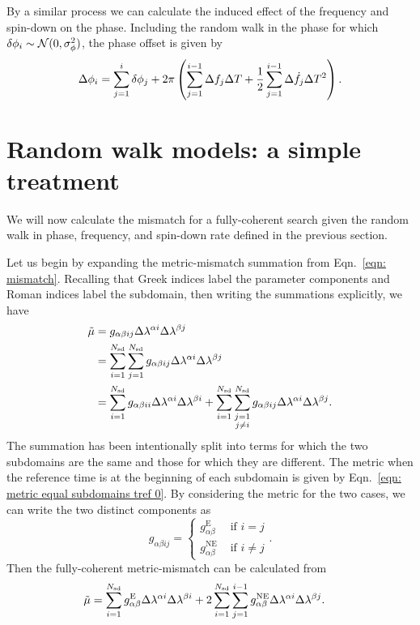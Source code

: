 \documentclass[../full_thesis/full_thesis.tex]{subfiles}
\begin{document}
By a similar process we can calculate the induced effect of the frequency and
spin-down on the phase. Including the random walk in the phase
for which $\delta \phi_i \sim \mathcal{N}(0, \sigma_{\phi}^{2})$, the phase offset is given by
\begin{equation}
\Delta\phi_{i}  =  \sum_{j=1}^{i}\delta \phi_{j} 
+ 2\pi\left(\sum_{j=1}^{i-1}\Delta f_{j}\Delta T 
+ \frac{1}{2}\sum_{j=1}^{i-1}\Delta \dot{f}_{j}\Delta T^{2}\right).
\label{eqn: phi offset}
\end{equation}



\section{Random walk models: a simple treatment}
\label{sec: random walk models part I}
We will now calculate the mismatch for a fully-coherent search given the
random walk in phase, frequency, and spin-down rate defined in the previous
section.

Let us begin by expanding the metric-mismatch summation from Eqn.~\eqref{eqn:
mismatch}. Recalling that Greek indices label the parameter components and
Roman indices label the subdomain, then writing the summations explicitly, we
have
\begin{align}
\tilde{\mu} & = g_{\alpha\beta i j}\Delta\lambda^{\alpha i}\Delta\lambda^{\beta j}  \\
&=\sum_{i=1}^{N_{\textrm{sd}}}\sum_{j=1}^{N_{\textrm{sd}}}g_{\alpha\beta i j}\Delta\lambda^{\alpha i}\Delta\lambda^{\beta j}  \\
&= \sum_{i=1}^{N_{\textrm{sd}}}g_{\alpha\beta i i}\Delta\lambda^{\alpha i}\Delta\lambda^{\beta i}
+ \sum_{i=1}^{N_{\textrm{sd}}} \sum_{\substack{j=1\\ j \ne i}}^{N_{\textrm{sd}}} g_{\alpha \beta ij}\Delta\lambda^{\alpha i}\Delta\lambda^{\beta j}.
\end{align}
The summation has been intentionally split into terms for which the two
subdomains are the same and those for which they are different. The metric when
the reference time is at the beginning of each subdomain is given by
Eqn.~\eqref{eqn: metric equal subdomains tref 0}. By considering the metric for
the two cases, we can write the two distinct components as
\begin{equation}
g_{\alpha\beta ij} = \left\{
\begin{array}{cc}
g_{\alpha\beta}^{\mathrm{E}} & \textrm{ if } i =j \\
g_{\alpha\beta}^{\mathrm{NE}} & \textrm{ if } i  \ne j
\end{array}\right.  .
\end{equation}
Then the fully-coherent metric-mismatch can be calculated from
\begin{align}
\tilde{\mu} &= \sum_{i=1}^{N_{\textrm{sd}}}g_{\alpha\beta}^{\mathrm{E}}\Delta\lambda^{\alpha i}\Delta\lambda^{\beta i}
+ 2\sum_{i=1}^{N_{\textrm{sd}}} \sum_{j=1}^{i-1} g_{\alpha \beta}^{\mathrm{NE}}\Delta\lambda^{\alpha i}\Delta\lambda^{\beta j} .
\label{eqn: mismatch sep}
\end{align}
\end{document}
